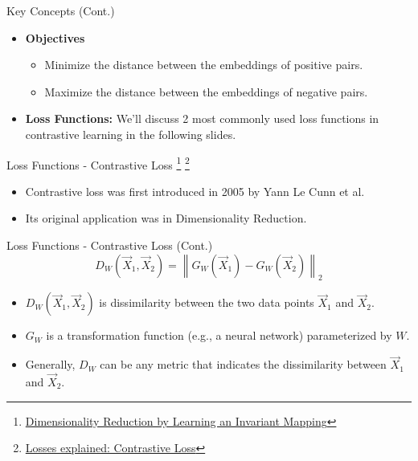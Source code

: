\documentclass[serif, aspectratio=169]{beamer}
\begin{document}
\begin{frame}{Key Concepts (Cont.)}
    \begin{itemize}
        \item \textbf{Objectives}
        \begin{itemize}
            \item Minimize the distance between the embeddings of positive pairs.
            \item Maximize the distance between the embeddings of negative pairs.
        \end{itemize}

        \item \textbf{Loss Functions:} We'll discuss 2 most commonly used loss functions in contrastive learning in the following slides.
    \end{itemize}
\end{frame}


\begin{frame}{Loss Functions - Contrastive Loss
 \footnote{\href{http://yann.lecun.com/exdb/publis/pdf/hadsell-chopra-lecun-06.pdf}{Dimensionality Reduction by Learning an Invariant Mapping}}
 \footnote{\href{https://medium.com/@maksym.bekuzarov/losses-explained-contrastive-loss-f8f57fe32246}{Losses explained: Contrastive Loss}}
}
     \begin{itemize}
         \item Contrastive loss was first introduced in 2005 by Yann Le Cunn et al.
         \item Its original application was in Dimensionality Reduction.
     \end{itemize}
\end{frame}


\begin{frame}{Loss Functions - Contrastive Loss (Cont.)}
\begin{equation*}
D_W\left(\vec{X}_1, \vec{X}_2\right)=\left\|G_W\left(\vec{X}_1\right)-G_W\left(\vec{X}_2\right)\right\|_2
\end{equation*}

    \begin{itemize}
        \item $D_W\left(\vec{X}_1, \vec{X}_2\right)$ is dissimilarity between the two data points $\vec{X}_1$ and $\vec{X}_2$.
        \item $G_W$ is a transformation function (e.g., a neural network) parameterized by $W$.
        \item Generally, $D_W$ can be any metric that indicates the dissimilarity between $\vec{X}_1$ and $\vec{X}_2$.
    \end{itemize}
\end{frame}
\end{document}
